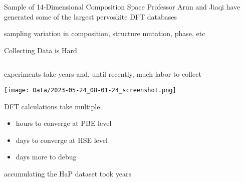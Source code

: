 \documentclass[10pt, aspectratio=169, presentation]{beamer}
\begin{document}
\begin{frame}[label={sec:orge580ea2}]{Sample of 14-Dimensional Composition Space}
Professor Arun and Jiaqi have generated some of the largest pervoskite DFT databases
\autocite{yang-2023-high-throug,pablo-2019-new-front}

sampling variation in composition, structure mutation, phase, etc
\end{frame}
\begin{frame}[label={sec:org55e82ed}]{Collecting Data is Hard}
\begin{columns}
\begin{column}{0.7\columnwidth}
experiments take years and, until recently, much labor to collect
\autocite{almora-2020-devic-perfor}
\begin{center}
\texttt{[image: Data/2023-05-24\_08-01-24\_screenshot.png]}
\end{center}

DFT calculations take multiple
\begin{itemize}
\item hours to converge at PBE level
\item days to converge at HSE level
\item days more to debug
\end{itemize}
accumulating the HaP dataset took years
\autocite{yang-2023-high-throug}
\end{column}
\begin{column}{0.3\columnwidth}
 
\begin{center}

\end{center}
\end{column}
\end{columns}
\end{frame}
\end{document}
